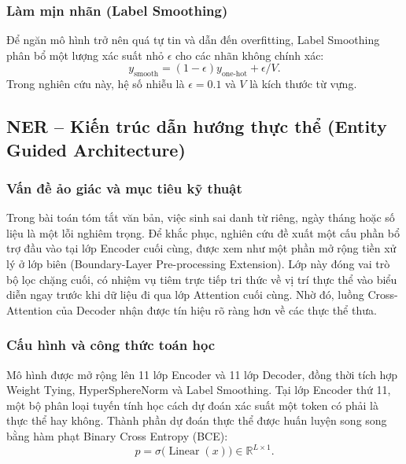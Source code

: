 \documentclass[11pt,a4paper]{article}
\numberwithin{equation}{section}
\newcommand{\R}{\mathbb{R}}
\begin{document}
\subsubsection{Làm mịn nhãn (Label Smoothing)}

Để ngăn mô hình trở nên quá tự tin và dẫn đến overfitting, Label Smoothing~\cite{szegedy2016rethinking} phân bổ một lượng xác suất nhỏ $\epsilon$ cho các nhãn không chính xác:
\begin{equation}
y_{\text{smooth}}
=(1-\epsilon)y_{\text{one-hot}}+\epsilon/V.
\label{eq:label-smoothing}
\end{equation}
Trong nghiên cứu này, hệ số nhiễu là $\epsilon=0.1$ và $V$ là kích thước từ vựng.

\subsection{NER -- Kiến trúc dẫn hướng thực thể (Entity Guided Architecture)}

\subsubsection{Vấn đề ảo giác và mục tiêu kỹ thuật}

Trong bài toán tóm tắt văn bản, việc sinh sai danh từ riêng, ngày tháng hoặc số liệu là một lỗi nghiêm trọng. Để khắc phục, nghiên cứu đề xuất một cấu phần bổ trợ đầu vào tại lớp Encoder cuối cùng, được xem như một phần mở rộng tiền xử lý ở lớp biên (Boundary-Layer Pre-processing Extension). Lớp này đóng vai trò bộ lọc chặng cuối, có nhiệm vụ tiêm trực tiếp tri thức về vị trí thực thể vào biểu diễn ngay trước khi dữ liệu đi qua lớp Attention cuối cùng. Nhờ đó, luồng Cross-Attention của Decoder nhận được tín hiệu rõ ràng hơn về các thực thể thưa.

\subsubsection{Cấu hình và công thức toán học}

Mô hình được mở rộng lên 11 lớp Encoder và 11 lớp Decoder, đồng thời tích hợp Weight Tying, HyperSphereNorm và Label Smoothing. Tại lớp Encoder thứ 11, một bộ phân loại tuyến tính học cách dự đoán xác suất một token có phải là thực thể hay không. Thành phần dự đoán thực thể được huấn luyện song song bằng hàm phạt Binary Cross Entropy (BCE):
\begin{equation}
p=\sigma\bigl(\operatorname{Linear}(x)\bigr)
\in\R^{L\times 1}.
\label{eq:entity-predictor}
\end{equation}
\end{document}
